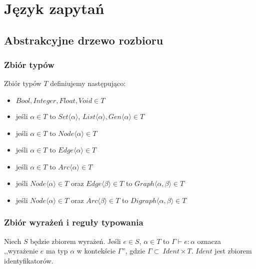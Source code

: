 \documentclass[thesis.tex]{subfiles}
\begin{document}
\chapter{Język zapytań}

\section{Abstrakcyjne drzewo rozbioru}

\subsection{Zbiór typów}
Zbiór typów $T$ definiujemy następująco:
\begin{itemize}
    \item $Bool, Integer, Float, Void \in T$
    \item jeśli $\alpha \in T$ to
        $Set\langle \alpha \rangle$, $List\langle \alpha \rangle,
        Gen\langle \alpha \rangle \in T$
    \item jeśli $\alpha \in T$ to
        $Node\langle \alpha \rangle \in T$
    \item jeśli $\alpha \in T$ to
        $Edge\langle \alpha \rangle \in T$
    \item jeśli $\alpha \in T$ to
        $Arc\langle \alpha \rangle \in T$
    \item jeśli $Node\langle \alpha \rangle \in T$ oraz $Edge\langle \beta \rangle \in T$ to
        $Graph\langle \alpha, \beta \rangle \in T$
    \item jeśli $Node\langle \alpha \rangle \in T$ oraz $Arc\langle \beta \rangle \in T$ to
        $Digraph\langle \alpha, \beta \rangle \in T$
\end{itemize}


\subsection{Zbiór wyrażeń i reguły typowania}
Niech $S$ będzie zbiorem wyrażeń. Jeśli $e \in S$, $\alpha \in T$ to $\Gamma
\vdash e : \alpha$ oznacza ,,wyrażenie $e$ ma typ $\alpha$ w kontekście
$\Gamma$'', gdzie $\Gamma \subset\ Ident \times T$. $Ident$ jest zbiorem identyfikatorów.
\end{document}
